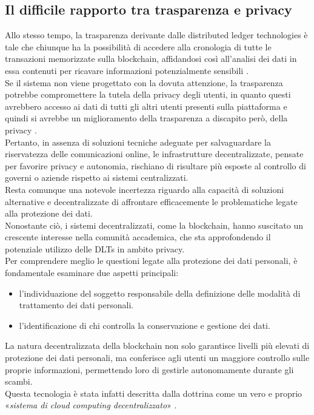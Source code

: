 \subsection{Il difficile rapporto tra trasparenza e privacy}
Allo stesso tempo, la trasparenza derivante dalle distributed ledger technologies è tale che chiunque ha la possibilità di accedere alla
cronologia di tutte le transazioni memorizzate sulla blockchain, affidandosi così all’analisi dei dati in essa contenuti per ricavare informazioni potenzialmente sensibili \cite{marr_history_blockchain_2018}.
\\Se il sistema non viene progettato con la dovuta attenzione, la trasparenza potrebbe compromettere la tutela della privacy degli utenti, in quanto questi avrebbero
accesso ai dati di tutti gli altri utenti presenti sulla piattaforma e quindi si avrebbe un miglioramento della trasparenza 
a discapito però, della privacy \cite{zambardino_blockchain_2022} \cite{mayes_privacy_transparency_2018}.\\
Pertanto, in assenza di soluzioni tecniche adeguate per salvaguardare la riservatezza delle comunicazioni online, le infrastrutture decentralizzate, pensate per favorire privacy e autonomia, 
rischiano di risultare più esposte al controllo di governi o aziende rispetto ai sistemi centralizzati.
\\Resta comunque una notevole incertezza riguardo alla capacità di soluzioni alternative e decentralizzate di affrontare efficacemente le problematiche legate alla protezione dei dati.
\\Nonostante ciò, i sistemi decentralizzati, come la blockchain, hanno suscitato un crescente interesse nella comunità accademica, che sta approfondendo il potenziale utilizzo delle DLTs in ambito privacy.
\\Per comprendere meglio le questioni legate alla protezione dei dati personali, è fondamentale esaminare due aspetti principali:
\begin{itemize}
    \item l'individuazione del soggetto responsabile della definizione delle modalità di trattamento dei dati personali.
    \item l'identificazione di chi controlla la conservazione e gestione dei dati.
\end{itemize}
La natura decentralizzata della blockchain non solo garantisce livelli più elevati di protezione dei dati personali, ma conferisce agli utenti un maggiore controllo sulle proprie informazioni, permettendo loro di gestirle autonomamente durante gli scambi. \\Questa tecnologia è stata infatti descritta dalla dottrina come un vero e proprio «\textit{sistema di cloud computing decentralizzato}» \cite{bridge_blockchain_2018}.
